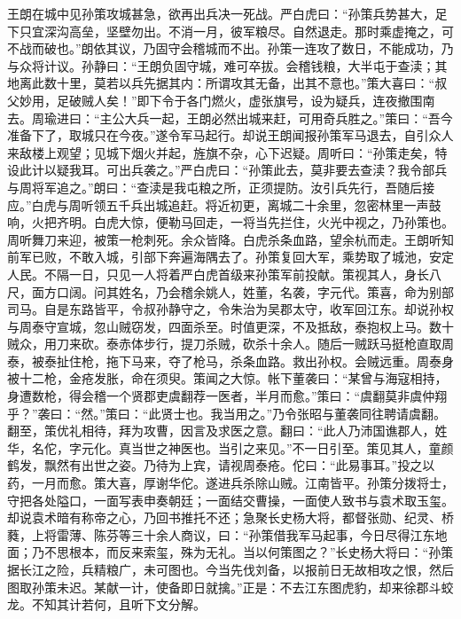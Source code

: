 王朗在城中见孙策攻城甚急，欲再出兵决一死战。严白虎曰：“孙策兵势甚大，足下只宜深沟高垒，坚壁勿出。不消一月，彼军粮尽。自然退走。那时乘虚掩之，可不战而破也。”朗依其议，乃固守会稽城而不出。孙策一连攻了数日，不能成功，乃与众将计议。孙静曰：“王朗负固守城，难可卒拔。会稽钱粮，大半屯于查渎；其地离此数十里，莫若以兵先据其内：所谓攻其无备，出其不意也。”策大喜曰：“叔父妙用，足破贼人矣！”即下令于各门燃火，虚张旗号，设为疑兵，连夜撤围南去。周瑜进曰：“主公大兵一起，王朗必然出城来赶，可用奇兵胜之。”策曰：“吾今准备下了，取城只在今夜。”遂令军马起行。却说王朗闻报孙策军马退去，自引众人来敌楼上观望；见城下烟火并起，旌旗不杂，心下迟疑。周听曰：“孙策走矣，特设此计以疑我耳。可出兵袭之。”严白虎曰：“孙策此去，莫非要去查渎？我令部兵与周将军追之。”朗曰：“查渎是我屯粮之所，正须提防。汝引兵先行，吾随后接应。”白虎与周听领五千兵出城追赶。将近初更，离城二十余里，忽密林里一声鼓响，火把齐明。白虎大惊，便勒马回走，一将当先拦住，火光中视之，乃孙策也。周听舞刀来迎，被策一枪刺死。余众皆降。白虎杀条血路，望余杭而走。王朗听知前军已败，不敢入城，引部下奔遍海隅去了。孙策复回大军，乘势取了城池，安定人民。不隔一日，只见一人将着严白虎首级来孙策军前投献。策视其人，身长八尺，面方口阔。问其姓名，乃会稽余姚人，姓董，名袭，字元代。策喜，命为别部司马。自是东路皆平，令叔孙静守之，令朱治为吴郡太守，收军回江东。却说孙权与周泰守宣城，忽山贼窃发，四面杀至。时值更深，不及抵敌，泰抱权上马。数十贼众，用刀来砍。泰赤体步行，提刀杀贼，砍杀十余人。随后一贼跃马挺枪直取周泰，被泰扯住枪，拖下马来，夺了枪马，杀条血路。救出孙权。会贼远重。周泰身被十二枪，金疮发胀，命在须臾。策闻之大惊。帐下董袭曰：“某曾与海寇相持，身遭数枪，得会稽一个贤郡吏虞翻荐一医者，半月而愈。”策曰：“虞翻莫非虞仲翔乎？”袭曰：“然。”策曰：“此贤士也。我当用之。”乃令张昭与董袭同往聘请虞翻。翻至，策优礼相待，拜为攻曹，因言及求医之意。翻曰：“此人乃沛国谯郡人，姓华，名佗，字元化。真当世之神医也。当引之来见。”不一日引至。策见其人，童颜鹤发，飘然有出世之姿。乃待为上宾，请视周泰疮。佗曰：“此易事耳。”投之以药，一月而愈。策大喜，厚谢华佗。遂进兵杀除山贼。江南皆平。孙策分拨将士，守把各处隘口，一面写表申奏朝廷；一面结交曹操，一面使人致书与袁术取玉玺。却说袁术暗有称帝之心，乃回书推托不还；急聚长史杨大将，都督张勋、纪灵、桥蕤，上将雷薄、陈芬等三十余人商议，曰：“孙策借我军马起事，今日尽得江东地面；乃不思根本，而反来索玺，殊为无礼。当以何策图之？”长史杨大将曰：“孙策据长江之险，兵精粮广，未可图也。今当先伐刘备，以报前日无故相攻之恨，然后图取孙策未迟。某献一计，使备即日就擒。”正是：不去江东图虎豹，却来徐郡斗蛟龙。不知其计若何，且听下文分解。